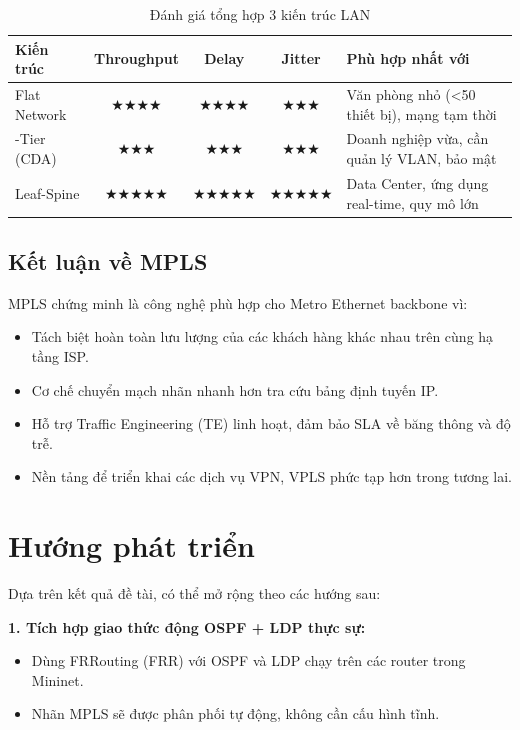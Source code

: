\begin{table}[htbp]
    \centering
    \caption{Đánh giá tổng hợp 3 kiến trúc LAN}
    \vspace{0.2cm}
    \begin{tabularx}{\textwidth}{|>{\raggedright\arraybackslash}p{2.5cm}|c|c|c|>{\raggedright\arraybackslash}X|}
        \hline
        \textbf{Kiến trúc} & \textbf{Throughput} & \textbf{Delay} & \textbf{Jitter} & \textbf{Phù hợp nhất với} \\ \hline
        Flat Network & ★★★★ & ★★★★ & ★★★ & Văn phòng nhỏ (\textless 50 thiết bị), mạng tạm thời \\ \hline
        3-Tier (CDA) & ★★★ & ★★★ & ★★★ & Doanh nghiệp vừa, cần quản lý VLAN, bảo mật \\ \hline
        Leaf-Spine & ★★★★★ & ★★★★★ & ★★★★★ & Data Center, ứng dụng real-time, quy mô lớn \\ \hline
    \end{tabularx}
\end{table}

\subsection{Kết luận về MPLS}

MPLS chứng minh là công nghệ phù hợp cho Metro Ethernet backbone vì:
\begin{itemize}
    \item Tách biệt hoàn toàn lưu lượng của các khách hàng khác nhau trên cùng hạ tầng ISP.
    \item Cơ chế chuyển mạch nhãn nhanh hơn tra cứu bảng định tuyến IP.
    \item Hỗ trợ Traffic Engineering (TE) linh hoạt, đảm bảo SLA về băng thông và độ trễ.
    \item Nền tảng để triển khai các dịch vụ VPN, VPLS phức tạp hơn trong tương lai.
\end{itemize}

\section{Hướng phát triển}

Dựa trên kết quả đề tài, có thể mở rộng theo các hướng sau:

\textbf{1. Tích hợp giao thức động OSPF + LDP thực sự:}
\begin{itemize}
    \item Dùng FRRouting (FRR) với OSPF và LDP chạy trên các router trong Mininet.
    \item Nhãn MPLS sẽ được phân phối tự động, không cần cấu hình tĩnh.
\end{itemize}


